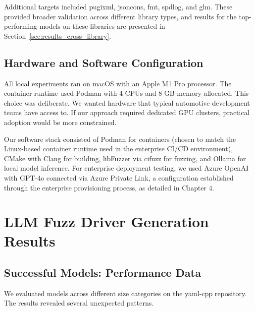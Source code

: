 Additional targets included pugixml, jsoncons, fmt, spdlog, and glm. These provided broader validation across different library types, and results for the top-performing models on these libraries are presented in Section~\ref{sec:results_cross_library}.


\subsection{Hardware and Software Configuration}
\label{sec:exp_hardware}

All local experiments ran on macOS with an Apple M1 Pro processor. The container runtime used Podman with 4 CPUs and 8 GB memory allocated. This choice was deliberate. We wanted hardware that typical automotive development teams have access to. If our approach required dedicated GPU clusters, practical adoption would be more constrained.

Our software stack consisted of Podman for containers (chosen to match the Linux-based container runtime used in the enterprise CI/CD environment), CMake with Clang for building, libFuzzer via cifuzz for fuzzing, and Ollama for local model inference. For enterprise deployment testing, we used Azure OpenAI with GPT-4o connected via Azure Private Link, a configuration established through the enterprise provisioning process, as detailed in Chapter 4.


\section{LLM Fuzz Driver Generation Results}
\label{sec:results_generation}

\subsection{Successful Models: Performance Data}
\label{sec:results_successful}

We evaluated models across different size categories on the yaml-cpp repository. The results revealed several unexpected patterns.

\begin{table}[htbp]
\centering
\caption{Model Performance Metrics on yaml-cpp Repository}
\label{tab:model_performance}
\end{table}

